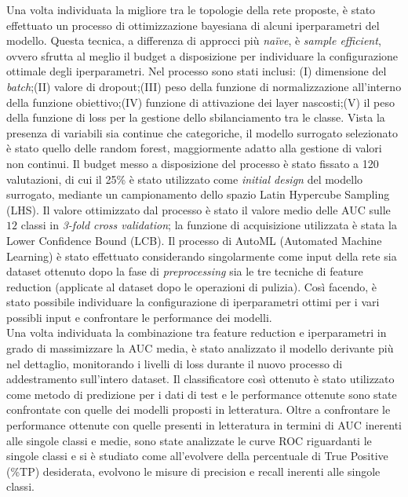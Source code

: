 Una volta individuata la migliore tra le topologie della rete proposte, è stato effettuato un processo di ottimizzazione bayesiana di alcuni iperparametri del modello. 
Questa tecnica, a differenza di approcci più \textit{na\"ive}, è \textit{sample efficient}, ovvero sfrutta al meglio il budget a disposizione per individuare la configurazione ottimale degli iperparametri. Nel processo sono stati inclusi: (I) dimensione del \textit{batch};(II) valore di dropout;(III) peso della funzione di normalizzazione all'interno della funzione obiettivo;(IV) funzione di attivazione dei layer nascosti;(V) il peso della funzione di loss per la gestione dello sbilanciamento tra le classe.
Vista la presenza di variabili sia continue che categoriche, il modello surrogato selezionato è stato quello delle random forest, maggiormente adatto alla gestione di valori non continui. 
Il budget messo a disposizione del processo è stato fissato a 120 valutazioni, di cui il 25\% è stato utilizzato come \textit{initial design} del modello surrogato, mediante un campionamento dello spazio Latin Hypercube Sampling (LHS). Il valore ottimizzato dal processo è stato il valore medio delle AUC sulle $12$ classi in \textit{3-fold cross validation}; la funzione di acquisizione utilizzata è stata la Lower Confidence Bound (LCB).
Il processo di AutoML (Automated Machine Learning) è stato effettuato considerando singolarmente come input della rete sia dataset ottenuto dopo la fase di \textit{preprocessing} sia le tre tecniche di feature reduction (applicate al dataset dopo le operazioni di pulizia).
Così facendo, è stato possibile individuare la configurazione di iperparametri ottimi per i vari possibli input e confrontare le performance dei modelli.\\ 
Una volta individuata la combinazione tra feature reduction e iperparametri in grado di massimizzare la AUC media, è stato analizzato il modello derivante più nel dettaglio, monitorando i livelli di loss durante il nuovo processo di addestramento sull'intero dataset.
Il classificatore così ottenuto è stato utilizzato come metodo di predizione per i dati di test e le performance ottenute sono state confrontate con quelle dei modelli proposti in letteratura.
Oltre a confrontare le performance ottenute con quelle presenti in letteratura in termini di AUC inerenti alle singole classi e medie, sono state analizzate le curve ROC riguardanti le singole classi e si è studiato come all'evolvere della percentuale di True Positive (\%TP) desiderata, evolvono le misure di precision e recall inerenti alle singole classi.